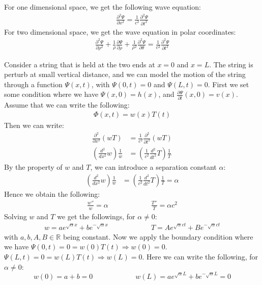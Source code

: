 \documentclass[11pt]{article}
\theoremstyle{break}
\theoremstyle{break}
\newcommand{\R}{\mathbb{R}}
\newcommand{\pd}{\partial}
\begin{document}
For one dimensional space, we get the following wave equation:
\begin{align*}
\frac{\partial^2 \Psi}{\partial x^2}=\frac{1}{c^2}\frac{\partial^2 \Psi}{\partial t^2} \tag{1}
\end{align*}
For two dimensional space, we get the wave equation in polar coordinates:
\begin{align*}
\frac{\partial^2 \Psi}{\partial \rho^2}+\frac{1}{\rho}\frac{\partial \Psi}{\partial \rho} + \frac{1}{\rho^2}\frac{\partial^2 \Psi}{\partial \theta} = \frac{1}{c^2}\frac{\partial^2 \Psi}{\partial t^2} \tag{2}
\end{align*}


Consider a string that is held at the two ends at $x=0$ and $x=L$. The string is perturb at small vertical distance, and we can model the motion of the string through a function $\Psi(x,t)$, with $\Psi(0,t) =0$ and $\Psi(L,t) = 0$. First we set some condition where we have $\Psi(x,0) = h(x)$, and $\frac{\partial \Psi}{\partial t}(x,0) = v(x)$. Assume that we can write the following:
\begin{align*}
\Phi(x,t)=w(x)T(t)
\end{align*}
Then we can write:
\begin{align*}
\frac{\pd^2}{\pd x^2}(wT) &= \frac{1}{c^2}\frac{\pd^2}{\pd t^2}(wT)\\
\left(\frac{d^2}{dx^2}w\right)\frac{1}{w} &= \left(\frac{1}{c^2}\frac{d^2}{dt^2}T\right)\frac{1}{T}
\end{align*}
By the property of $w$ and $T$, we can introduce a separation constant $\alpha$:
\begin{align*}
\left(\frac{d^2}{dx^2}w\right)\frac{1}{w} &= \left(\frac{1}{c^2}\frac{d^2}{dt^2}T\right)\frac{1}{T} = \alpha
\end{align*}
Hence we obtain the following:
\begin{align*}
\frac{w''}{w} = \alpha\qquad\qquad\qquad \frac{T''}{T} = \alpha c^2
\end{align*}
Solving $w$ and $T$ we get the followings, for $\alpha \neq 0$:
\begin{align*}
w=ae^{\sqrt{\alpha}x}+be^{-\sqrt{\alpha}x}\qquad\qquad\qquad T=Ae^{\sqrt{\alpha}ct} + Be^{-\sqrt{\alpha}ct}
\end{align*}
with $a,b,A,B \in \R$ being constant. 
Now we apply the boundary condition where we have $\Psi(0,t) = 0 = w(0)T(t) \Rightarrow w(0) = 0$.  $\Psi(L,t) = 0 = w(L)T(t) \Rightarrow w(L) = 0$. Here we can write the following, for $\alpha\neq 0$:
$$w(0) = a+b=0 \qquad\qquad\qquad w(L)=ae^{\sqrt{\alpha}L}+be^{-\sqrt{\alpha}L} = 0$$
\end{document}
